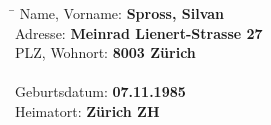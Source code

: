 \begin{tabbing}
	\hspace*{4cm}   \= \kill
	Name, Vorname:  \> {\bf Spross, Silvan} \\
	Adresse:        \> {\bf Meinrad Lienert-Strasse 27} \\
	PLZ, Wohnort:   \> {\bf 8003 Zürich} \\
	\\
	Geburtsdatum:   \> {\bf 07.11.1985} \\
	Heimatort:      \> {\bf Zürich ZH} \\
\end{tabbing}
